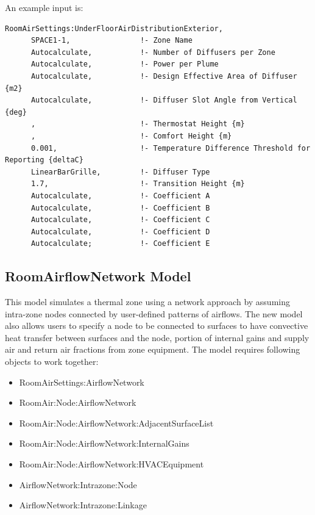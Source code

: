An example input is:

\begin{lstlisting}
RoomAirSettings:UnderFloorAirDistributionExterior,
      SPACE1-1,                !- Zone Name
      Autocalculate,           !- Number of Diffusers per Zone
      Autocalculate,           !- Power per Plume
      Autocalculate,           !- Design Effective Area of Diffuser {m2}
      Autocalculate,           !- Diffuser Slot Angle from Vertical {deg}
      ,                        !- Thermostat Height {m}
      ,                        !- Comfort Height {m}
      0.001,                   !- Temperature Difference Threshold for Reporting {deltaC}
      LinearBarGrille,         !- Diffuser Type
      1.7,                     !- Transition Height {m}
      Autocalculate,           !- Coefficient A
      Autocalculate,           !- Coefficient B
      Autocalculate,           !- Coefficient C
      Autocalculate,           !- Coefficient D
      Autocalculate;           !- Coefficient E
\end{lstlisting}

\subsection{RoomAirflowNetwork Model}\label{roomairflownetwork-model}

This model simulates a thermal zone using a network approach by assuming intra-zone nodes connected by user-defined patterns of airflows. The new model also allows users to specify a node to be connected to surfaces to have convective heat transfer between surfaces and the node, portion of internal gains and supply air and return air fractions from zone equipment. The model requires following objects to work together:

\begin{itemize}
  \item
    RoomAirSettings:AirflowNetwork
  \item
    RoomAir:Node:AirflowNetwork
  \item
    Room\-Air\-:Node:\-Air\-flow\-Net\-work:\-Ad\-jacent\-Sur\-face\-List
  \item
    RoomAir:Node:Air\-flow\-Net\-work:\-Internal\-Gains
  \item
    RoomAir:Node:Air\-flow\-Net\-work:\-HVAC\-Equipment
  \item
    AirflowNetwork:Intrazone:Node
  \item
    Airflow\-Net\-work:\-Intra\-zone:\-Link\-age
\end{itemize}

